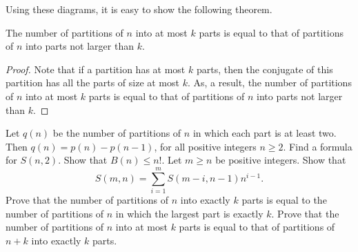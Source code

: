 Using these diagrams, it is easy to show the following theorem.
\begin{theorem}
  The number of partitions of $n$ into at most $k$ parts is equal to that of
  partitions of $n$ into parts not larger than $k$.
\end{theorem}
\begin{proof}
  Note that if a partition has at most $k$ parts, then the conjugate of this
  partition has all the parts of size at most $k$. As, a result, the number
  of partitions of $n$ into at most $k$ parts is equal to that of
  partitions of $n$ into parts not larger than $k$.
\end{proof}

\begin{chapterendexercises}
  \exercise
    Let $q(n)$ be the number of partitions of $n$ in which each part is at least
    two. Then $q(n) = p(n) - p(n - 1)$, for all positive integers $n \ge 2$.
  \exercise[recommended] Find a formula for $S(n, 2)$.
  \exercise[recommended] Show that $B(n) \le n!$.
  \exercise Let $m \ge n$ be positive integers. Show that
    \[
      S(m, n) = \sum_{i = 1}^m S(m - i, n - 1) n^{i - 1}.
    \]
  \exercise Prove that the number of partitions of $n$ into exactly $k$
    parts is equal to the number of partitions of $n$ in which the
    largest part is exactly $k$.
  \exercise[recommended] Prove that the number of partitions of $n$ into at most $k$
    parts is equal to that of partitions of $n + k$ into exactly $k$ parts.
\end{chapterendexercises}
